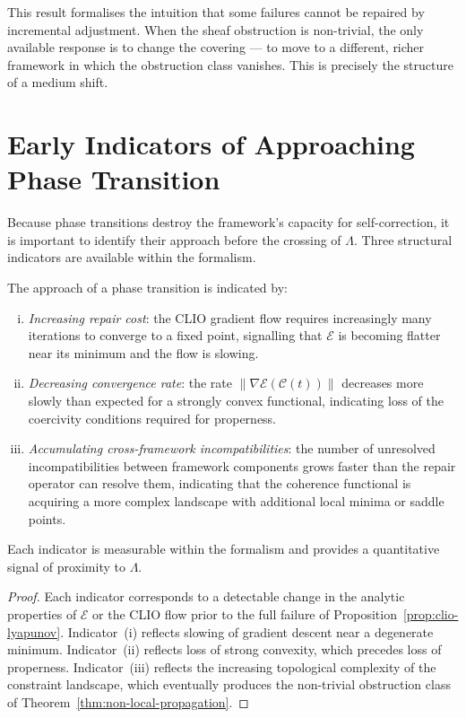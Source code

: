 \documentclass[11pt,openany]{book}
\begin{document}
This result formalises the intuition that some failures
cannot be repaired by incremental adjustment.  When the
sheaf obstruction is non-trivial, the only available
response is to change the covering --- to move to a
different, richer framework in which the obstruction class
vanishes.  This is precisely the structure of a medium
shift.

\section{Early Indicators of Approaching Phase Transition}
\label{sec:indicators}

Because phase transitions destroy the framework's capacity
for self-correction, it is important to identify their
approach before the crossing of $\Lambda$.  Three
structural indicators are available within the formalism.

\begin{proposition}
\label{prop:indicators}
The approach of a phase transition is indicated by:
\begin{enumerate}[(i)]
  \item \emph{Increasing repair cost}: the CLIO gradient
    flow requires increasingly many iterations to converge
    to a fixed point, signalling that $\mathcal{E}$ is
    becoming flatter near its minimum and the flow is
    slowing.
  \item \emph{Decreasing convergence rate}: the rate
    $\|\nabla \mathcal{E}(\mathcal{C}(t))\|$ decreases
    more slowly than expected for a strongly convex
    functional, indicating loss of the coercivity
    conditions required for properness.
  \item \emph{Accumulating cross-framework incompatibilities}:
    the number of unresolved incompatibilities between
    framework components grows faster than the repair
    operator can resolve them, indicating that the coherence
    functional is acquiring a more complex landscape with
    additional local minima or saddle points.
\end{enumerate}
Each indicator is measurable within the formalism and
provides a quantitative signal of proximity to $\Lambda$.
\end{proposition}

\begin{proof}
Each indicator corresponds to a detectable change in the
analytic properties of $\mathcal{E}$ or the CLIO flow
prior to the full failure of Proposition~\ref{prop:clio-lyapunov}.
Indicator~(i) reflects slowing of gradient descent near a
degenerate minimum.  Indicator~(ii) reflects loss of strong
convexity, which precedes loss of properness.
Indicator~(iii) reflects the increasing topological
complexity of the constraint landscape, which eventually
produces the non-trivial obstruction class of
Theorem~\ref{thm:non-local-propagation}.
\end{proof}
\end{document}

